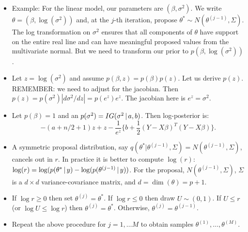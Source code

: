 {\scriptsize
\begin{frame}
\begin{itemize}\setlength{\itemsep}{0cm}

\item Example: For the linear model, our parameters are $(\beta,\sigma^2)$. We write $\theta=(\beta,\log(\sigma^2))$ and, at the $j$-th iteration, propose $\theta^{\ast}\sim N(\theta^{(j-1)},\Sigma)$. The log transformation on $\sigma^2$ ensures that all components of $\theta$ have support on the entire real line and can have meaningful proposed values from the multivariate normal. But we need to transform our prior to $p(\beta,\log(\sigma^2))$.

\item Let $z=\log(\sigma^2)$ and assume $p(\beta,z)=p(\beta)p(z)$. Let us derive $p(z)$. \alert{REMEMBER:} we need to adjust for the jacobian.  Then $p(z)=p(\sigma^2)|d\sigma^2/dz| = p(e^z)e^z$. The jacobian here is $e^z=\sigma^2$.

\item Let $p(\beta)=1$ and an $p(\sigma^2)=IG(\sigma^2\,|\, a,b)$. Then log-posterior is:
\[
-(a+n/2+1)z + z -
\frac{1}{e^z}\{b+\frac{1}{2}(Y-X\beta)^{T}(Y-X\beta)\}.
\]

\item A symmetric proposal distribution, say $q(\theta^*|\theta^{(j-1)},\Sigma)= N(\theta^{(j-1)},\Sigma)$, cancels out in $r$.  In practice it is better to compute $\log(r)$:  $\log(r)=\log(p(\theta^{\ast}\,|\, y) - \log(p(\theta^{(j-1)}\,|\, y))$. For the proposal, $N(\theta^{(j-1)},\Sigma)$, $\Sigma$ is a $d\times d$ variance-covariance matrix, and $d=\dim(\theta) = p+1$. 

\item If $\log r \geq 0$ then set $\theta^{(j)}=\theta^{\ast}$. If $\log r \leq 0$ then draw $U\sim(0,1)$. If $U \leq r$ (or $\log U \leq \log r$) then $\theta^{(j)}=\theta^{\ast}$. Otherwise, $\theta^{(j)}=\theta^{(j-1)}$.

\item Repeat the above procedure for $j=1,\ldots M$ to obtain samples $\theta^{(1)},\ldots,\theta^{(M)}$.

\end{itemize}

\end{frame}
}



